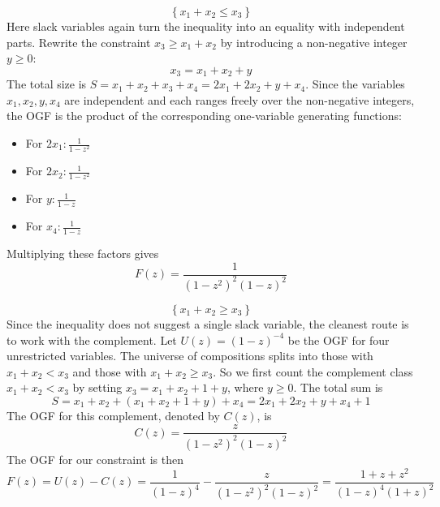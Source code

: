 \partsep
{}
\begin{equation*}
    \left\{x_{1} + x_{2}\leq x_{3}\right\}
\end{equation*}
Here slack variables again turn the inequality into an equality with independent parts.
Rewrite the constraint $x_{3}\geq x_{1} + x_{2}$ by introducing a non-negative integer $y\geq 0$:
\begin{equation*}
    x_{3} = x_{1} + x_{2} + y
\end{equation*}
The total size is $S = x_{1} + x_{2} + x_{3} + x_{4} = 2x_{1} + 2x_{2} + y + x_{4}$.
Since the variables $x_{1}, x_{2}, y, x_{4}$ are independent and each ranges freely over the non-negative integers, the OGF is the product of
the corresponding one-variable generating functions:
\begin{itemize}
    \item For $2x_{1}: \frac{1}{1 - z^{2}}$
    \item For $2x_{2}: \frac{1}{1 - z^{2}}$
    \item For $y: \frac{1}{1 - z}$
    \item For $x_{4}: \frac{1}{1 - z}$
\end{itemize}
Multiplying these factors gives
\begin{equation*}
    F(z) = \frac{1}{(1 -z^{2})^{2}(1 -z)^{2}}
\end{equation*}

\partsep
{}
\begin{equation*}
    \left\{x_{1} + x_{2}\geq x_{3}\right\}
\end{equation*}
Since the inequality does not suggest a single slack variable, the cleanest route is to work with the complement.
Let $U(z) = (1 - z)^{-4}$ be the OGF for four unrestricted variables. The universe of compositions splits into those with $x_{1} + x_{2} < x_{3}$ and those with $x_{1} + x_{2} \geq x_{3}$.
So we first count the complement class $x_{1} + x_{2} < x_{3}$ by setting $x_{3} = x_{1} + x_{2} + 1 + y$, where $y\geq 0$.
The total sum is
\begin{equation*}
    S = x_{1} + x_{2} + (x_{1} + x_{2} + 1 + y) + x_{4} = 2x_{1} + 2x_{2} + y + x_{4} + 1
\end{equation*}
The OGF for this complement, denoted by $C(z)$, is
\begin{equation*}
    C(z) = \frac{z}{(1 - z^{2})^{2}(1 - z)^{2}}
\end{equation*}
The OGF for our constraint is then
\begin{equation*}
    F(z) = U(z) - C(z) = \frac{1}{(1 - z)^{4}} - \frac{z}{(1 - z^{2})^{2}(1 - z)^{2}} = \frac{1 + z + z^{2}}{(1 - z)^{4}(1 + z)^{2}}
\end{equation*}

